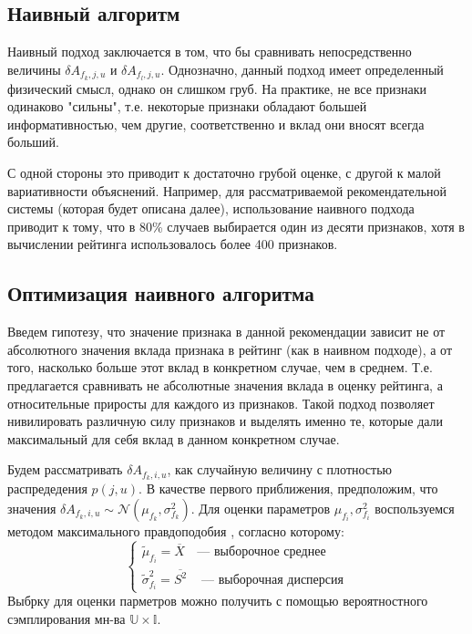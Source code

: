 \documentclass[12pt,a4paper]{report}
\begin{document}
\subsection{Наивный алгоритм}
Наивный подход заключается в том, что бы сравнивать непосредственно величины $\delta A_{f_k, j, u}$ и $\delta A_{f_l, j, u}$. Однозначно, данный подход имеет определенный физический смысл, однако он слишком груб. На практике, не все признаки одинаково "сильны", т.е. некоторые признаки обладают большей информативностью, чем другие, соответственно и вклад они вносят всегда больший.

С одной стороны это приводит к достаточно грубой оценке, с другой к малой вариативности объяснений.
Например, для рассматриваемой рекомендательной системы (которая будет описана далее), использование наивного подхода приводит к тому, что в 80\% случаев выбирается один из десяти признаков, хотя в вычислении рейтинга использовалось более 400 признаков.

\subsection{Оптимизация наивного алгоритма}
Введем гипотезу, что значение признака в данной рекомендации зависит не от абсолютного значения вклада признака в рейтинг (как в наивном подходе), а от того, насколько больше этот вклад в конкретном случае, чем в среднем. Т.е. предлагается сравнивать не абсолютные значения вклада в оценку рейтинга, а относительные приросты для каждого из признаков.
Такой подход позволяет нивилировать различную силу признаков и выделять именно те, которые дали максимальный для себя вклад в данном конкретном случае.

Будем рассматривать $\delta A_{f_k, i, u}$, как случайную величину с плотностью распредедения $p(j, u)$.
В качестве первого приближения, предположим, что значения $\delta A_{f_k, i, u} \sim\mathcal{N}(\mu_{f_k}, \sigma_{f_k}^2)$.
Для оценки параметров $\mu_{f_i}, \sigma_{f_i}^2$ воспользуемся методом максимального правдоподобия \cite{Mle}, согласно которому:
\begin{equation*}
\begin{cases}
\tilde{\mu}_{f_i} = \overline{X} &\text{--- выборочное среднее} 
\\ \tilde{\sigma}_{f_i}^2 = \overline{S^2} &\text{ --- выборочная дисперсия}
\end{cases}
\end{equation*}
Выбрку для оценки парметров можно получить с помощью вероятностного сэмплирования мн-ва $\mathbb{U} \times \mathbb{I}$.
\end{document}
